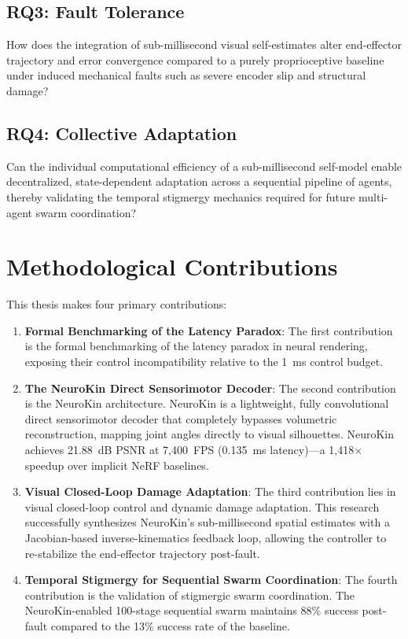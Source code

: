 \documentclass[12pt,a4paper,oneside]{report}
\begin{document}
\subsection{RQ3: Fault Tolerance}
How does the integration of sub-millisecond visual self-estimates alter end-effector trajectory and error convergence compared to a purely proprioceptive baseline under induced mechanical faults such as severe encoder slip and structural damage?

\subsection{RQ4: Collective Adaptation}
Can the individual computational efficiency of a sub-millisecond self-model enable decentralized, state-dependent adaptation across a sequential pipeline of agents, thereby validating the temporal stigmergy mechanics required for future multi-agent swarm coordination?

\section{Methodological Contributions}
\label{sec:methodological_contributions_intro}

This thesis makes four primary contributions:
\begin{enumerate}
    \item \textbf{Formal Benchmarking of the Latency Paradox}: The first contribution is the formal benchmarking of the latency paradox in neural rendering, exposing their control incompatibility relative to the 1~ms control budget.
    \item \textbf{The NeuroKin Direct Sensorimotor Decoder}: The second contribution is the NeuroKin architecture. NeuroKin is a lightweight, fully convolutional direct sensorimotor decoder that completely bypasses volumetric reconstruction, mapping joint angles directly to visual silhouettes. NeuroKin achieves 21.88~dB PSNR at 7,400~FPS (0.135~ms latency)---a 1,418$\times$ speedup over implicit NeRF baselines.
    \item \textbf{Visual Closed-Loop Damage Adaptation}: The third contribution lies in visual closed-loop control and dynamic damage adaptation. This research successfully synthesizes NeuroKin's sub-millisecond spatial estimates with a Jacobian-based inverse-kinematics feedback loop, allowing the controller to re-stabilize the end-effector trajectory post-fault.
    \item \textbf{Temporal Stigmergy for Sequential Swarm Coordination}: The fourth contribution is the validation of stigmergic swarm coordination. The NeuroKin-enabled 100-stage sequential swarm maintains 88\% success post-fault compared to the 13\% success rate of the baseline.
\end{enumerate}
\end{document}
